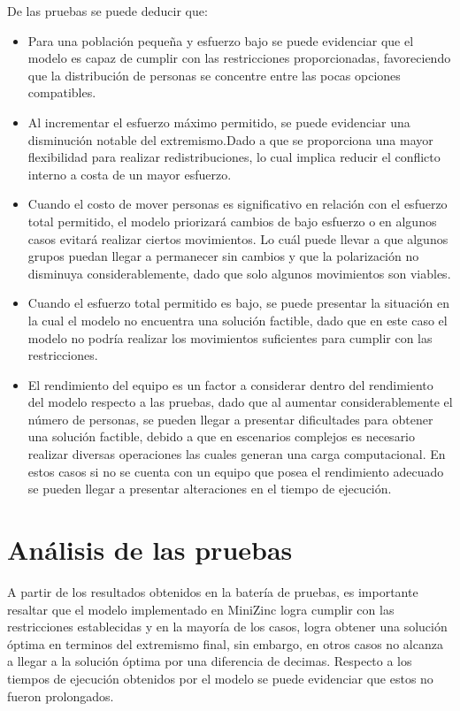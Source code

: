 \documentclass[11pt,letter]{article}
\begin{document}
De las pruebas se puede deducir que:
\begin{itemize}
    \item Para una población pequeña y esfuerzo bajo se puede evidenciar que el modelo es capaz de cumplir con las restricciones proporcionadas, favoreciendo que la distribución de personas se concentre entre las pocas opciones compatibles.

    \item Al incrementar el esfuerzo máximo permitido, se puede evidenciar una disminución notable del extremismo.Dado a que se proporciona una mayor flexibilidad para realizar redistribuciones, lo cual implica reducir el conflicto interno a costa de un mayor esfuerzo.

    \item Cuando el costo de mover personas es significativo en relación con el esfuerzo total permitido, el modelo priorizará cambios de bajo esfuerzo o en algunos casos evitará realizar ciertos movimientos. Lo cuál puede llevar a que algunos grupos puedan llegar a permanecer sin cambios y que la polarización no disminuya considerablemente, dado que solo algunos movimientos son viables.

    \item Cuando el esfuerzo total permitido es bajo, se puede presentar la situación en la cual el modelo no encuentra una solución factible, dado que en este caso el modelo no podría realizar los movimientos suficientes para cumplir con las restricciones.

    \item El rendimiento del equipo es un factor a considerar dentro del rendimiento del modelo respecto a las pruebas, dado que al aumentar considerablemente el número de personas, se pueden llegar a presentar dificultades para obtener una solución factible, debido a que en escenarios complejos es necesario realizar diversas operaciones las cuales generan una carga computacional. En estos casos si no se cuenta con un equipo que posea el rendimiento adecuado se pueden llegar a presentar alteraciones en el tiempo de ejecución.


\end{itemize}



\section{Análisis de las pruebas}

A partir de los resultados obtenidos en la batería de pruebas, es importante resaltar que el modelo implementado en MiniZinc logra cumplir con las restricciones establecidas y en la mayoría de los casos, logra obtener una solución óptima en terminos del extremismo final, sin embargo, en otros casos no alcanza a llegar a la solución óptima por una diferencia de decimas. Respecto a los tiempos de ejecución obtenidos por el modelo se puede evidenciar que estos no fueron prolongados.
\end{document}
